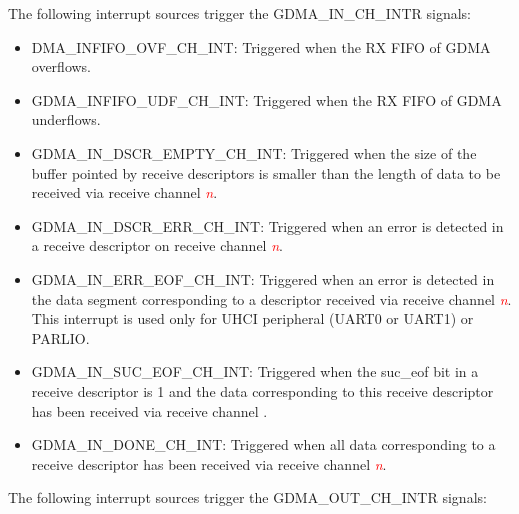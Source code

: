 \documentclass[main\_\_EN.tex]{subfiles}
\begin{document}
The following interrupt sources trigger the GDMA\_IN\_CH\_INTR signals:

\begin{itemize}
\item \label{int:GDMAINFIFOOVFINT}DMA\_INFIFO\_OVF\_CH\_INT: Triggered when the RX FIFO of GDMA overflows.
\item \label{int:GDMAINFIFOUDFINT}GDMA\_INFIFO\_UDF\_CH\_INT: Triggered when the  RX FIFO of GDMA underflows.
\item \label{int:GDMAINDSCREMPTYINT}GDMA\_IN\_DSCR\_EMPTY\_CH\_INT: Triggered when the size of the buffer pointed by receive descriptors is smaller than the length of data to be received via receive channel \textcolor{red}{\it{n}}.
\item \label{int:GDMAINDSCRERRINT}GDMA\_IN\_DSCR\_ERR\_CH\_INT: Triggered when an error is detected in a receive descriptor on receive channel \textcolor{red}{\it{n}}.
\item \label{int:GDMAINERREOFINT}GDMA\_IN\_ERR\_EOF\_CH\_INT: Triggered when an error is detected in the data segment corresponding to a descriptor received via receive channel \textcolor{red}{\it{n}}. This interrupt is used only for UHCI peripheral (UART0 or UART1) or PARLIO.
\item \label{int:GDMAINSUCEOFINT}GDMA\_IN\_SUC\_EOF\_CH\_INT: Triggered when the suc\_eof bit in a receive descriptor is 1 and the data corresponding to this receive descriptor has been received via receive channel .
\item \label{int:GDMAINDONEINT}GDMA\_IN\_DONE\_CH\_INT: Triggered when all data corresponding to a receive descriptor has been received via receive channel \textcolor{red}{\it{n}}.
\end{itemize}

The following interrupt sources trigger the GDMA\_OUT\_CH\_INTR signals:
\end{document}
